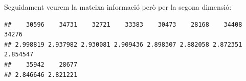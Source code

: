 \documentclass[
]{article}
\newenvironment{Shaded}{\begin{snugshade}}{\end{snugshade}}
\newcommand{\AttributeTok}[1]{\textcolor[rgb]{0.77,0.63,0.00}{#1}}
\newcommand{\ConstantTok}[1]{\textcolor[rgb]{0.00,0.00,0.00}{#1}}
\newcommand{\DecValTok}[1]{\textcolor[rgb]{0.00,0.00,0.81}{#1}}
\newcommand{\FunctionTok}[1]{\textcolor[rgb]{0.00,0.00,0.00}{#1}}
\newcommand{\NormalTok}[1]{#1}
\newcommand{\OtherTok}[1]{\textcolor[rgb]{0.56,0.35,0.01}{#1}}
\newcommand{\SpecialCharTok}[1]{\textcolor[rgb]{0.00,0.00,0.00}{#1}}
\newcommand{\StringTok}[1]{\textcolor[rgb]{0.31,0.60,0.02}{#1}}
\begin{document}
Seguidament veurem la mateixa informació però per la segona dimensió:

\begin{Shaded}
\end{Shaded}

\begin{verbatim}
##    30596    34731    32721    33383    30473    28168    34408    34276 
## 2.998819 2.937982 2.930081 2.909436 2.898307 2.882058 2.872351 2.854547 
##    35942    28677 
## 2.846646 2.821221
\end{verbatim}

\begin{Shaded}
\end{Shaded}
\end{document}
